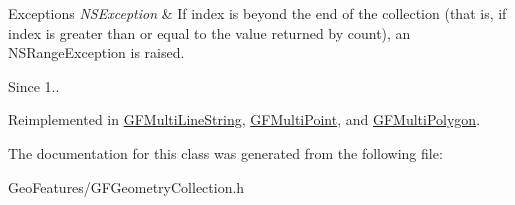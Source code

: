\begin{DoxyExceptions}{Exceptions}
{\em N\+S\+Exception} & If index is beyond the end of the collection (that is, if index is greater than or equal to the value returned by count), an N\+S\+Range\+Exception is raised.\\
\hline
\end{DoxyExceptions}
\begin{DoxySince}{Since}
1.. 
\end{DoxySince}


Reimplemented in \hyperlink{interface_g_f_multi_line_string_a00496d2af8be614fe4cc11c6a6347591}{G\+F\+Multi\+Line\+String}, \hyperlink{interface_g_f_multi_point_a003241a11b6d6da14364bb8a07c05a35}{G\+F\+Multi\+Point}, and \hyperlink{interface_g_f_multi_polygon_ac0de2e4160cbb5e83522fc72502f681c}{G\+F\+Multi\+Polygon}.



The documentation for this class was generated from the following file\+:\begin{DoxyCompactItemize}
\item 
Geo\+Features/G\+F\+Geometry\+Collection.\+h\end{DoxyCompactItemize}

